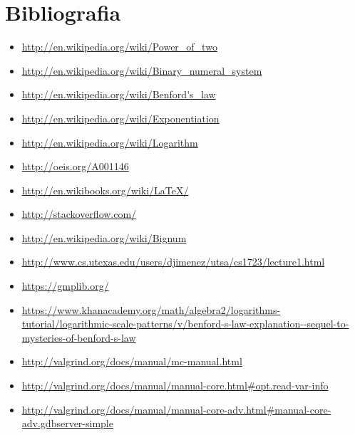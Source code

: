 \documentclass[10pt,a4paper]{article}
\begin{document}
\section{Bibliografia}
	\begin{itemize}
		\item \url{http://en.wikipedia.org/wiki/Power_of_two}
		\item \url{http://en.wikipedia.org/wiki/Binary_numeral_system}
		\item \url{http://en.wikipedia.org/wiki/Benford's_law}
		\item \url{http://en.wikipedia.org/wiki/Exponentiation}
		\item \url{http://en.wikipedia.org/wiki/Logarithm}
		\item \url{http://oeis.org/A001146}
		\item \url{http://en.wikibooks.org/wiki/LaTeX/}
		\item \url{http://stackoverflow.com/}
		\item \url{http://en.wikipedia.org/wiki/Bignum}
		\item \url{http://www.cs.utexas.edu/users/djimenez/utsa/cs1723/lecture1.html}
		\item \url{https://gmplib.org/}
		\item \url{https://www.khanacademy.org/math/algebra2/logarithms-tutorial/logarithmic-scale-patterns/v/benford-s-law-explanation--sequel-to-mysteries-of-benford-s-law}
		\item \url{http://valgrind.org/docs/manual/mc-manual.html}
		\item \url{http://valgrind.org/docs/manual/manual-core.html#opt.read-var-info}
		\item \url{http://valgrind.org/docs/manual/manual-core-adv.html#manual-core-adv.gdbserver-simple}
	\end{itemize}
\newpage
\end{document}

